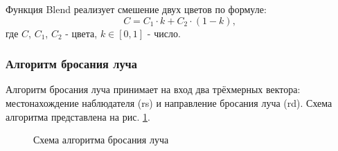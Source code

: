 \documentclass[a4paper, 14pt]{report}
\begin{document}
	Функция Blend реализует смешение двух цветов по формуле:
	\begin{equation}
		C = C_1\cdot k+C_2\cdot(1-k),
	\end{equation}
	где $C$, $C_1$, $C_2$ - цвета, $k\in[0, 1]$ - число.

	\subsubsection{Алгоритм бросания луча}
	Алгоритм бросания луча принимает на вход два трёхмерных вектора: местонахождение наблюдателя (rs) и направление бросания луча (rd). Схема алгоритма представлена на рис. \ref{fig:throw_ray}.
	
	\begin{figure}[!ht]
		\caption{Схема алгоритма бросания луча}
		\label{fig:throw_ray}
	\end{figure}
\end{document}
